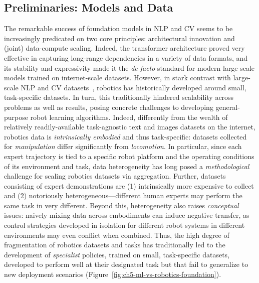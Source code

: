 \subsection{Preliminaries: Models and Data}
The remarkable success of foundation models in NLP and CV seems to be increasingly predicated on two core principles: architectural innovation and (joint) data-compute scaling.
Indeed, the transformer architecture proved very effective in capturing long-range dependencies in a variety of data formats, and its stability and expressivity made it the \emph{de facto} standard for modern large-scale models trained on internet-scale datasets.
However, in stark contrast with large-scale NLP and CV datasets~\citep{raffelExploringLimitsTransfer2023,ImageNet_VSS09}, robotics has historically developed around small, task-specific datasets. 
In turn, this traditionally hindered scalability across problems as well as results, posing concrete challenges to developing general-purpose robot learning algorithms.
Indeed, differently from the wealth of relatively readily-available task-agnostic text and images datasets on the internet, robotics data is \emph{intrinsically embodied} and thus task-specific: datasets collected for \emph{manipulation} differ significantly from \emph{locomotion}.
In particular, since each expert trajectory is tied to a specific robot platform and the operating conditions of its environment and task, data heterogeneity has long posed a \emph{methodological} challenge for scaling robotics datasets via aggregation.
Further, datasets consisting of expert demonstrations are (1) intrinsically more expensive to collect and (2) notoriously heterogeneous---different human experts may perform the same task in very different.
Beyond this, heterogeneity also raises \emph{conceptual} issues: naively mixing data across embodiments can induce negative transfer, as control strategies developed in isolation for different robot systems in different environments may even conflict when combined.
Thus, the high degree of fragmentation of robotics datasets and tasks has traditionally led to the development of \emph{specialist} policies, trained on small, task-specific datasets, developed to perform well at their designated task but that fail to generalize to new deployment scenarios (Figure~\ref{fig:ch5-ml-vs-robotics-foundation}).

